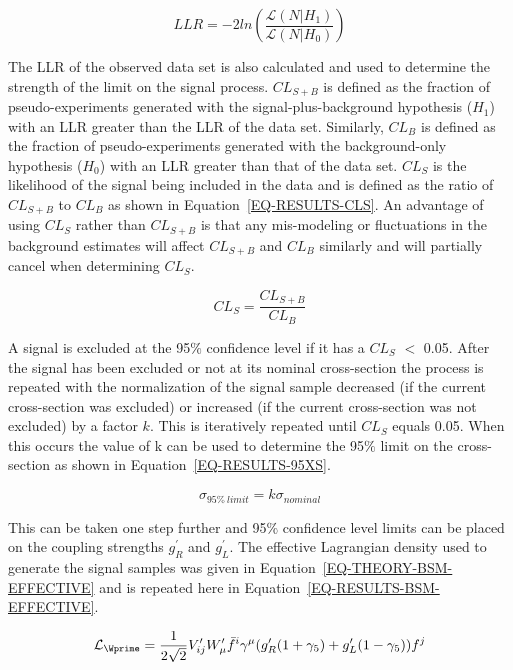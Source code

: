 \begin{equation}
\label{EQ-RESULTS-LLR}
LLR = -2ln\left(\frac{\mathcal{L}(N|H_1)}{\mathcal{L}(N|H_0)}\right)
\end{equation}

\noindent
The LLR of the observed data set is also calculated and used to determine the strength of the limit on the signal process. $CL_{S+B}$ is defined as the fraction of pseudo-experiments generated with the signal-plus-background hypothesis ($H_1$) with an LLR greater than the LLR of the data set. Similarly, $CL_B$ is defined as the fraction of pseudo-experiments generated with the background-only hypothesis ($H_0$) with an LLR greater than that of the data set. $CL_S$ is the likelihood of the signal being included in the data and is defined as the ratio of $CL_{S+B}$ to $CL_B$ as shown in Equation~\ref{EQ-RESULTS-CLS}.  An advantage of using $CL_S$ rather than $CL_{S+B}$ is that any mis-modeling or fluctuations in the background estimates will affect $CL_{S+B}$ and $CL_B$ similarly and will partially cancel when determining $CL_S$.

\begin{equation}
\label{EQ-RESULTS-CLS}
CL_S = \frac{CL_{S+B}}{CL_B}
\end{equation}

A signal is excluded at the 95$\%$ confidence level if it has a $CL_S$ $<$ 0.05. After the signal has been excluded or not at its nominal cross-section the process is repeated with the normalization of the signal sample decreased (if the current cross-section was excluded) or increased (if the current cross-section was not excluded) by a factor $k$. This is iteratively repeated until $CL_S$ equals 0.05. When this occurs the value of k can be used to determine the 95$\%$ limit on the cross-section as shown in Equation~\ref{EQ-RESULTS-95XS}.

\begin{equation}
\label{EQ-RESULTS-95XS}
\sigma_{95\%\ limit} = k\sigma_{nominal}
\end{equation}

This can be taken one step further and 95$\%$ confidence level limits can be placed on the coupling strengths $g^\prime_R$ and $g^\prime_L$. The effective Lagrangian density used to generate the signal samples was given in Equation~\ref{EQ-THEORY-BSM-EFFECTIVE} and is repeated here in Equation~\ref{EQ-RESULTS-BSM-EFFECTIVE}.

\begin{equation}
\label{EQ-RESULTS-BSM-EFFECTIVE}
\mathcal{L}_{\Wprime} = \frac{1}{2\sqrt{2}}V^\prime_{ij}W^\prime_{\mu}\bar{f}^i\gamma^{\mu}(g^\prime_R(1+\gamma_5)+g^\prime_L(1-\gamma_5))f^j
\end{equation}


